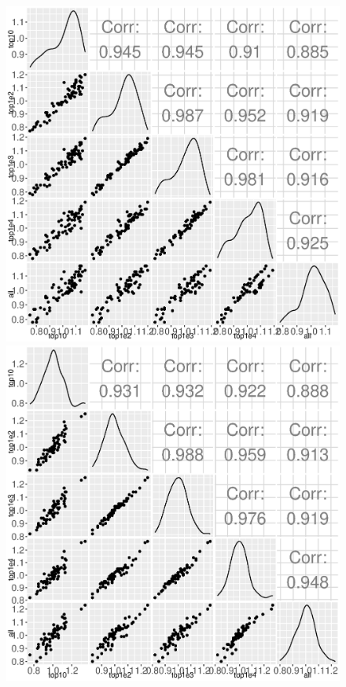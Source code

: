 \documentclass[11pt, a4paper]{article}
\begin{document}
 \begin{figure}[h!]
\begin{center}
\includegraphics[scale=0.4]{Figures/norm1.eps}
\includegraphics[scale=0.4]{Figures/norm2.eps}

\end{center}
\end{figure}
\end{document}

